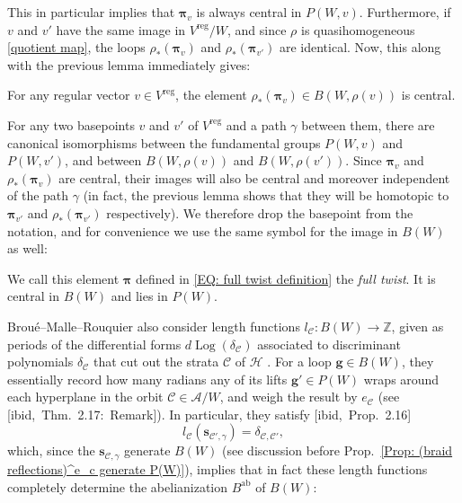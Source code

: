 \documentclass[ALCO, Unicode]{cedram}
\newcommand{\op}[1]{\operatorname{#1}}
\newcommand{\ZZ}{\mathbb{Z}}
\newcommand{\op}[1]{\operatorname{#1}}
\begin{document}
This in particular implies that $\bm\pi_v$ is always central in $P(W,v)$. Furthermore, if $v$ and $v'$ have the same image in $V^{\op{reg}}/W$, and since $\rho$ is quasihomogeneous \eqref{quotient map}, the loops $\rho_*(\bm\pi_v)$ and $\rho_*(\bm\pi_{v'})$ are identical. Now, this along with the previous lemma immediately gives:

\begin{coro}\label{Corol. full twist is central in B(W)}
For any regular vector $v\in V^{\op{reg}}$, the element $\rho_*(\bm\pi_v)\in B(W,\rho(v))$ is central.
\end{coro}

For any two basepoints $v$ and $v'$ of $V^{\op{reg}}$ and a path $\gamma$ between them, there are canonical isomorphisms between the fundamental groups $P(W,v)$ and $P(W,v')$, and between $B(W,\rho(v))$ and $B(W,\rho(v'))$. Since $\bm\pi_v$ and $\rho_*(\bm \pi_v)$ are central, their images will also be central and moreover independent of the path $\gamma$ (in fact, the previous lemma shows that they will be homotopic to $\bm\pi_{v'}$ and $\rho_*(\bm\pi_{v'})$ respectively). We therefore drop the basepoint from the notation, and for convenience we use the same symbol for the image in $B(W)$ as well:
\begin{defi}\label{Defn: The full twist}
We call this element $\bm\pi$ defined in \eqref{EQ: full twist definition} the {\it\color{blue} full twist}. It is central in $B(W)$ and lies in $P(W)$.
\end{defi}


Brou{\'e}--Malle--Rouquier also consider \cite[Defn.~2.15]{broue-malle-rouquier-braid-hecke} length functions $l_{\mathcal{C}}:B(W)\rightarrow \ZZ$, given as periods of the differential forms $d\op{Log}(\delta_{\mathcal{C}})$ associated to discriminant polynomials $\delta_{\mathcal{C}}$ that cut out the strata $\mathcal{C}$ of $\mathcal{H}$ \cite[Defn.~2.15]{broue-malle-rouquier-braid-hecke}. For a loop $\bm g\in B(W)$, they essentially record how many radians any of its lifts $\bm g'\in P(W)$ wraps around each hyperplane in the orbit $\mathcal{C}\in\mathcal{A}/W$, and weigh the result by $e_{\mathcal{C}}$ (see [ibid,~Thm.~2.17:~Remark]). In particular, they satisfy [ibid,~Prop.~2.16] $$l_{\mathcal{C}}(\bm s_{\mathcal{C'},\gamma})=\delta_{\mathcal{C},\mathcal{C'}},$$ which, since the $\bm s_{\mathcal{C},\gamma}$ generate $B(W)$ (see discussion before Prop.~\ref{Prop: (braid reflections)^e_c generate P(W)}), implies that in fact these length functions completely determine the abelianization $B^{\op{ab}}$ of $B(W)$:
\end{document}
